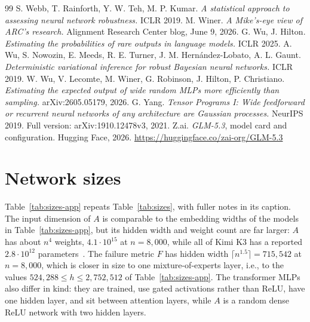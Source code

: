 \documentclass[10pt]{article}
\begin{document}
\begin{thebibliography}{99}
 S. Webb, T. Rainforth, Y. W. Teh, M. P. Kumar. \emph{A statistical approach to assessing neural network robustness.} ICLR 2019.
 M. Winer. \emph{A Mike's-eye view of ARC's research.} Alignment Research Center blog, June 9, 2026.
 G. Wu, J. Hilton. \emph{Estimating the probabilities of rare outputs in language models.} ICLR 2025.
 A. Wu, S. Nowozin, E. Meeds, R. E. Turner, J. M. Hern\'andez-Lobato, A. L. Gaunt. \emph{Deterministic variational inference for robust Bayesian neural networks.} ICLR 2019.
 W. Wu, V. Lecomte, M. Winer, G. Robinson, J. Hilton, P. Christiano. \emph{Estimating the expected output of wide random MLPs more efficiently than sampling.} arXiv:2605.05179, 2026.
 G. Yang. \emph{Tensor Programs I: Wide feedforward or recurrent neural networks of any architecture are Gaussian processes.} NeurIPS 2019. Full version: arXiv:1910.12478v3, 2021.
 Z.ai. \emph{GLM-5.3}, model card and configuration. Hugging Face, 2026. \url{https://huggingface.co/zai-org/GLM-5.3}
\end{thebibliography}

\appendix
\section{Network sizes}\label{app:sizes}

Table~\ref{tab:sizes-app} repeats Table~\ref{tab:sizes}, with fuller notes in
its caption. The input dimension of $A$ is comparable to the
embedding widths of the models in Table~\ref{tab:sizes-app}, but its hidden width and weight count are
far larger: $A$ has about $n^4$ weights, $4.1\cdot10^{15}$ at $n=8{,}000$,
while all of Kimi K3 has a reported $2.8\cdot10^{12}$
parameters~\citep{kimi-2026-k3}. The failure metric $F$ has hidden width
$\lceil n^{1.5}\rceil=715{,}542$ at $n=8{,}000$, which is closer in size to one
mixture-of-experts layer, i.e., to the values $524{,}288\le h\le2{,}752{,}512$
of Table~\ref{tab:sizes-app}. The transformer MLPs also differ in kind: they are
trained, use gated activations rather than ReLU, have one
hidden layer, and sit between attention layers, while $A$ is a random dense
ReLU network with two hidden layers.
\end{document}
